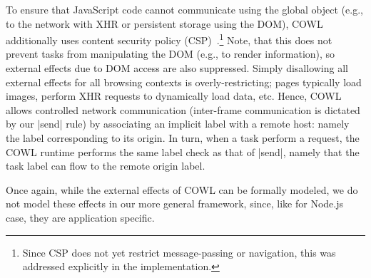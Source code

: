 To ensure that JavaScript code cannot communicate using the global object
(e.g., to the network with XHR or persistent storage using the DOM),
COWL additionally uses content security policy (CSP)~\cite{csp1.1}.\footnote{
  Since CSP does not yet restrict message-passing or navigation, this
  was addressed explicitly in the implementation.
}
%
Note, that this does not prevent tasks from manipulating the DOM
(e.g., to render information), so external effects due to DOM access
are also suppressed.
%
Simply disallowing all external effects for all browsing contexts is
overly-restricting; pages typically load images, perform XHR requests
to dynamically load data,
etc.
%
Hence, COWL allows
controlled network communication (inter-frame communication is
dictated by our |send| rule) by associating an implicit label with a
remote host: namely the label corresponding to its origin.
%
In turn, when a task perform a request, the COWL runtime performs the
same label check as that of |send|, namely that the task label can
flow to
the remote origin label.

Once again, while the external effects of COWL can be formally modeled,
we do not model these effects in our more general framework, since, like
for Node.js case, they are application specific.
%




